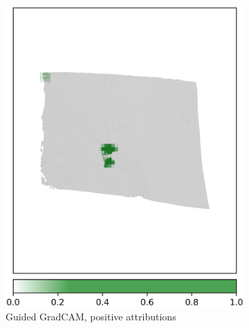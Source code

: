 \begin{figure}[h!t]
\begin{subfigure}[b]{0.49\textwidth}
         \includegraphics[width=\textwidth]{latex/captum/case13b/guided_gradcam_pos_case13-stain42-dead_2415days.png}
         \caption{Guided GradCAM, positive attributions}
     \end{subfigure}
    \hfill
     \begin{subfigure}[b]{0.49\textwidth}
         \centering

\end{subfigure}
\end{figure}
